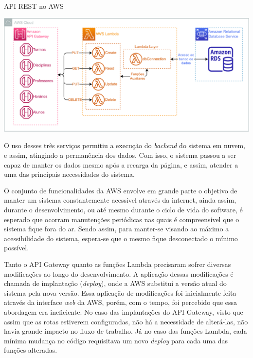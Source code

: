 \begin{MyCenteredFigure} \caption{API REST no AWS} \label{fig:APIAWS}
  \includegraphics[width=\textwidth]{files/img/2.02!5-desenvolvimento/2.02!5.1.4-sistema/diagramas/API/API-Funcionamento}
\end{MyCenteredFigure}

O uso desses três serviços permitiu a execução do \textit{backend} do sistema em nuvem, e assim, atingindo a permanência dos dados. Com isso, o sistema passou a ser capaz de manter os dados mesmo após a recarga da página, e assim, atender a uma das principais necessidades do sistema.


 \label{ssssec:Implantação}

O conjunto de funcionalidades da AWS envolve em grande parte o objetivo de manter um sistema constantemente acessível através da internet, ainda assim, durante o desenvolvimento, ou até mesmo durante o ciclo de vida do software, é esperado que ocorram manutenções periódicas nas quais é compreensível que o sistema fique fora do ar. Sendo assim, para manter-se visando ao máximo a acessibilidade do sistema, espera-se que o mesmo fique desconectado o mínimo possível.

Tanto o API Gateway quanto as funções Lambda precisaram sofrer diversas modificações ao longo do desenvolvimento. A aplicação dessas modificações é chamada de implantação (\textit{deploy}), onde a AWS substitui a versão atual do sistema pela nova versão. Essa aplicação de modificações foi inicialmente feita através da interface \textit{web} da AWS, porém, com o tempo, foi percebido que essa abordagem era ineficiente. No caso das implantações do API Gateway, visto que assim que as rotas estiverem configuradas, não há a necessidade de alterá-las, não havia grande impacto no fluxo de trabalho. Já no caso das funções Lambda, cada mínima mudança no código requisitava um novo \textit{deploy} para cada uma das funções alteradas.

